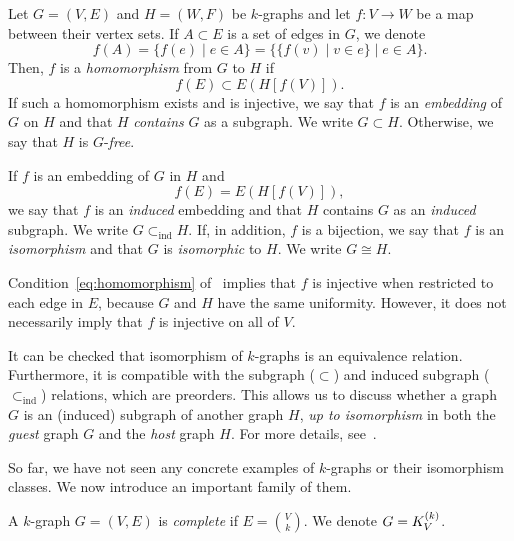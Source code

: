 \begin{definition} \label{def:embedding}
    Let $G = (V, E)$ and $H = (W, F)$ be $k$-graphs and let $f: V \to W$ be a map
    between their vertex sets.
    If $A \subset E$ is a set of edges in $G$, we denote
    \[
        f(A) = \{f(e) \mid e \in A\} = \{\{f(v) \mid v \in e\} \mid e \in A\}.
    \]
    Then, $f$ is a \emph{homomorphism} from $G$ to $H$ if
    \begin{equation}
        \label{eq:homomorphism}
        f(E) \subset E(H[f(V)]).
    \end{equation}
    If such a homomorphism exists
    and is injective, we say that $f$ is an \emph{embedding} of $G$ on $H$
    and that $H$ \emph{contains} $G$ as a subgraph.
    We write $G \subset H$.
    Otherwise, we say that $H$ is $G$-\emph{free}.

    If $f$ is an embedding of $G$ in $H$ and
    \begin{equation}
        \label{eq:induced_embedding}
        f(E) = E(H[f(V)]),
    \end{equation}
    we say that $f$ is an \emph{induced} embedding
    and that $H$ contains $G$ as an \emph{induced} subgraph.
    We write $G \subset_{\text{ind}} H$.
    If, in addition, $f$ is a bijection, we say that $f$ is an \emph{isomorphism}
    and that $G$ is \emph{isomorphic} to $H$.
    We write $G \cong H$.
\end{definition}

\begin{remark}
    Condition~\eqref{eq:homomorphism} of~
    implies that $f$ is injective
    when restricted to each edge in $E$, because $G$ and $H$ have the same uniformity.
    However, it does not necessarily imply that $f$ is injective on all of $V$.
\end{remark}

It can be checked that isomorphism of $k$-graphs is an equivalence relation.
Furthermore, it is compatible with the subgraph ($\subset$) and induced subgraph
($\subset_{\text{ind}}$) relations, which are preorders.
This allows us to discuss whether a graph $G$ is an (induced) subgraph of another graph $H$,
\emph{ up to isomorphism} in both the \emph{guest} graph $G$ and the \emph{host} graph $H$.
For more details, see~.

So far, we have not seen any concrete examples of $k$-graphs or their isomorphism classes.
We now introduce an important family of them.

\begin{definition} \label{def:complete}
    A $k$-graph $G = (V, E)$ is \emph{complete} if $E = \binom{V}{k}$.
    We denote $G = K^{(k)}_{V}$.
\end{definition}

